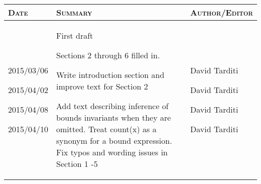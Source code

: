 \documentclass[]{article}
\begin{document}
\begin{longtable}[c]{@{}lll@{}}
\toprule
\textbf{\textsc{Date}} & \textbf{\textsc{Summary}} &
\textbf{\textsc{Author/Editor}}\tabularnewline
\midrule
\endhead
2015/03/06

2015/04/02

2015/04/08

2015/04/10 & First draft

Sections 2 through 6 filled in.

Write introduction section and improve text for Section 2

Add text describing inference of bounds invariants when they are
omitted. Treat count(x) as a synonym for a bound expression. Fix typos
and wording issues in Section 1 -5 & David Tarditi

David Tarditi

David Tarditi

David Tarditi


\end{longtable}
\end{document}
